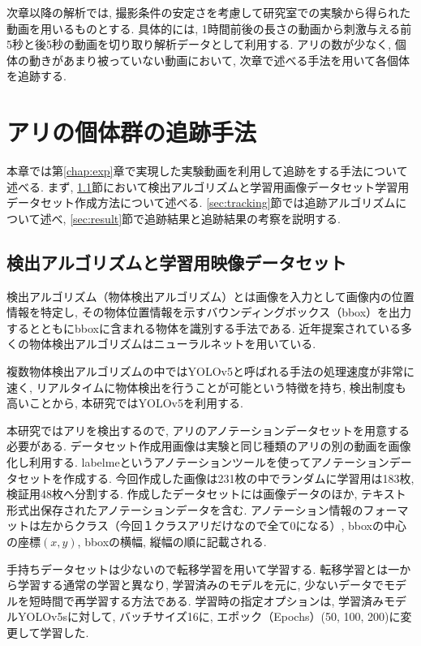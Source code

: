 ﻿\documentclass[a4paper, 12pt]{jsreport}
\begin{document}
次章以降の解析では, 撮影条件の安定さを考慮して研究室での実験から得られた動画を用いるものとする. 具体的には, 1時間前後の長さの動画から刺激与える前5秒と後5秒の動画を切り取り解析データとして利用する. アリの数が少なく, 個体の動きがあまり被っていない動画において, 次章で述べる手法を用いて各個体を追跡する. 


\chapter{アリの個体群の追跡手法}
\label{chap:trac}
本章では第\ref{chap:exp}章で実現した実験動画を利用して追跡をする手法について述べる. 
まず, \ref{sec:detector}節において検出アルゴリズムと学習用画像データセット学習用データセット作成方法について述べる. \ref{sec:tracking}節では追跡アルゴリズムについて述べ, \ref{sec:result}節で追跡結果と追跡結果の考察を説明する. 
\section{検出アルゴリズムと学習用映像データセット}
\label{sec:detector}
検出アルゴリズム（物体検出アルゴリズム）とは画像を入力として画像内の位置情報を特定し, その物体位置情報を示すバウンディングボックス（bbox）を出力するとともにbboxに含まれる物体を識別する手法である. 近年提案されている多くの物体検出アルゴリズムはニューラルネットを用いている. 


複数物体検出アルゴリズムの中ではYOLOv5と呼ばれる手法の処理速度が非常に速く, リアルタイムに物体検出を行うことが可能という特徴を持ち, 検出制度も高いことから, 本研究ではYOLOv5を利用する. 

本研究ではアリを検出するので, アリのアノテーションデータセットを用意する必要がある. データセット作成用画像は実験と同じ種類のアリの別の動画を画像化し利用する. labelmeというアノテーションツールを使ってアノテーションデータセットを作成する. 今回作成した画像は231枚の中でランダムに学習用は183枚, 検証用48枚へ分割する. 作成したデータセットには画像データのほか, テキスト形式出保存されたアノテーションデータを含む. アノテーション情報のフォーマットは左からクラス（今回１クラスアリだけなので全て0になる）, bboxの中心の座標$(x, y)$, bboxの横幅, 縦幅の順に記載される. 

手持ちデータセットは少ないので転移学習を用いて学習する. 転移学習とは一から学習する通常の学習と異なり, 学習済みのモデルを元に, 少ないデータでモデルを短時間で再学習する方法である. 学習時の指定オプションは, 学習済みモデルYOLOv5sに対して, バッチサイズ16に, エポック（Epochs）(50,  100,  200)に変更して学習した. 
\end{document}
